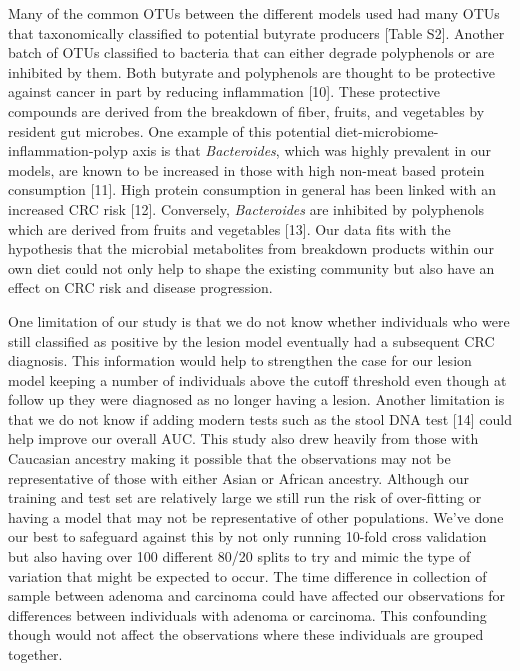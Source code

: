 \documentclass[12pt,]{article}
\begin{document}
Many of the common OTUs between the different models used had many OTUs
that taxonomically classified to potential butyrate producers {[}Table
S2{]}. Another batch of OTUs classified to bacteria that can either
degrade polyphenols or are inhibited by them. Both butyrate and
polyphenols are thought to be protective against cancer in part by
reducing inflammation {[}10{]}. These protective compounds are derived
from the breakdown of fiber, fruits, and vegetables by resident gut
microbes. One example of this potential
diet-microbiome-inflammation-polyp axis is that \emph{Bacteroides},
which was highly prevalent in our models, are known to be increased in
those with high non-meat based protein consumption {[}11{]}. High
protein consumption in general has been linked with an increased CRC
risk {[}12{]}. Conversely, \emph{Bacteroides} are inhibited by
polyphenols which are derived from fruits and vegetables {[}13{]}. Our
data fits with the hypothesis that the microbial metabolites from
breakdown products within our own diet could not only help to shape the
existing community but also have an effect on CRC risk and disease
progression.

One limitation of our study is that we do not know whether individuals
who were still classified as positive by the lesion model eventually had
a subsequent CRC diagnosis. This information would help to strengthen
the case for our lesion model keeping a number of individuals above the
cutoff threshold even though at follow up they were diagnosed as no
longer having a lesion. Another limitation is that we do not know if
adding modern tests such as the stool DNA test {[}14{]} could help
improve our overall AUC. This study also drew heavily from those with
Caucasian ancestry making it possible that the observations may not be
representative of those with either Asian or African ancestry. Although
our training and test set are relatively large we still run the risk of
over-fitting or having a model that may not be representative of other
populations. We've done our best to safeguard against this by not only
running 10-fold cross validation but also having over 100 different
80/20 splits to try and mimic the type of variation that might be
expected to occur. The time difference in collection of sample between
adenoma and carcinoma could have affected our observations for
differences between individuals with adenoma or carcinoma. This
confounding though would not affect the observations where these
individuals are grouped together.
\end{document}
